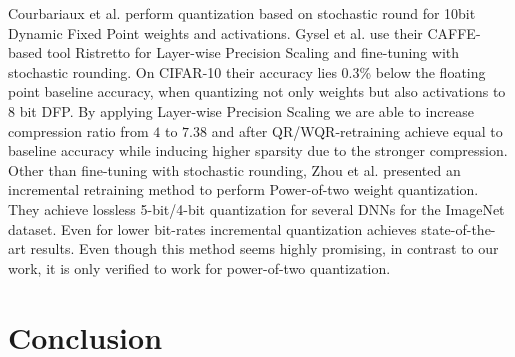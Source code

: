 Courbariaux et al. \cite{Courbariaux2014} perform quantization based on stochastic round for 10bit Dynamic Fixed Point weights and activations.  Gysel et al. \cite{Gysel2016} use their CAFFE-based tool Ristretto for Layer-wise Precision Scaling and fine-tuning with stochastic rounding. On CIFAR-10 their accuracy lies 0.3\% below the floating point baseline accuracy, when quantizing not only weights but also activations to 8 bit DFP. By applying Layer-wise Precision Scaling we are able to increase compression ratio from $4$ to $7.38$ and after QR/WQR-retraining achieve equal to baseline accuracy while inducing higher sparsity due to the stronger compression.
Other than fine-tuning with stochastic rounding, Zhou et al. \cite{Zhou2017a} presented an incremental retraining method to perform Power-of-two weight quantization. They achieve lossless 5-bit/4-bit quantization for several DNNs for the ImageNet dataset. Even for lower bit-rates incremental quantization achieves state-of-the-art results. Even though this method seems highly promising, in contrast to our work, it is only verified to work for power-of-two quantization.



\section{Conclusion}

